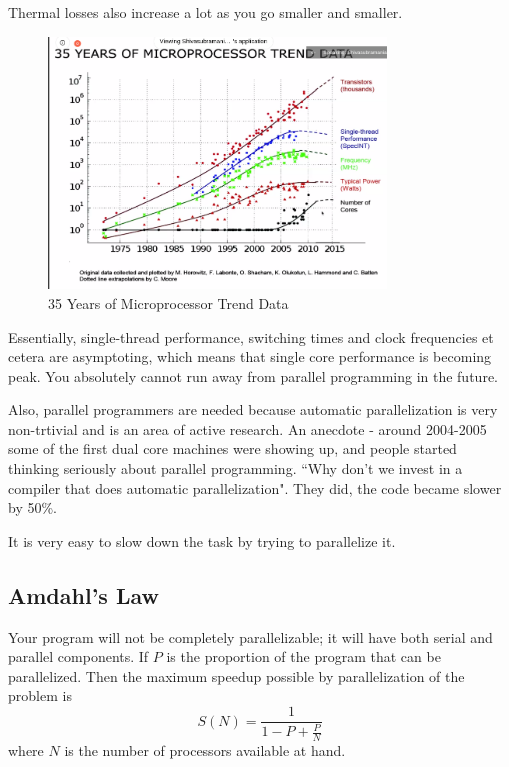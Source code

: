 \documentclass[a4paper]{article}
\begin{document}
Thermal losses also increase a lot as you go smaller and smaller.

\begin{figure}[h]
	\centering
	\includegraphics[width=0.8\textwidth]{figures/proctrends.png}
	\caption{35 Years of Microprocessor Trend Data}
	\label{fig:figures-proctrends-png}
\end{figure}

Essentially, single-thread performance, switching times and clock frequencies
et cetera are asymptoting, which means that single core performance
is becoming peak. You absolutely cannot run away from parallel
programming in the future.

Also, parallel programmers are needed because automatic parallelization
is very non-trtivial and is an area of active research.
An anecdote - around 2004-2005 some of the first dual core machines
were showing up, and people started thinking seriously about 
parallel programming. ``Why don't we invest in a compiler that does
automatic parallelization". They did, the code became slower by 50\%.

It is very easy to slow down the task by trying to parallelize it.

\subsection*{Amdahl's Law}
Your program will not be completely parallelizable; it will have both
serial and parallel components. If $P$ is the proportion of the program
that can be parallelized. Then the maximum speedup possible by parallelization
of the problem is 
\begin{equation} \label{amdahl}
	S(N) = \frac{1}{1 - P + \frac{P}{N}}
\end{equation}
where $N$ is the number of processors available at hand.
\end{document}

